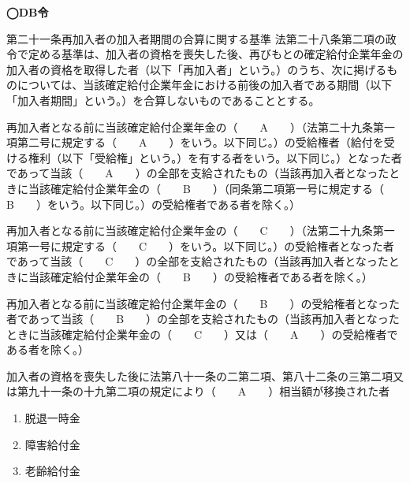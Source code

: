 \begin{fillblank}[自作 2026/10/11]
  \noindent \textbf{◯DB令}
  \begin{lawstructure}
    \begin{lawarticle}{第二十一条}{再加入者の加入者期間の合算に関する基準}
      法第二十八条第二項の政令で定める基準は、加入者の資格を喪失した後、再びもとの確定給付企業年金の加入者の資格を取得した者（以下「再加入者」という。）のうち、次に掲げるものについては、当該確定給付企業年金における前後の加入者である期間（以下「加入者期間」という。）を合算しないものであることとする。

      再加入者となる前に当該確定給付企業年金の（　　A　　）（法第二十九条第一項第二号に規定する（　　A　　）をいう。以下同じ。）の受給権者（給付を受ける権利（以下「受給権」という。）を有する者をいう。以下同じ。）となった者であって当該（　　A　　）の全部を支給されたもの（当該再加入者となったときに当該確定給付企業年金の（　　B　　）（同条第二項第一号に規定する（　　B　　）をいう。以下同じ。）の受給権者である者を除く。）

      再加入者となる前に当該確定給付企業年金の（　　C　　）（法第二十九条第一項第一号に規定する（　　C　　）をいう。以下同じ。）の受給権者となった者であって当該（　　C　　）の全部を支給されたもの（当該再加入者となったときに当該確定給付企業年金の（　　B　　）の受給権者である者を除く。）

      再加入者となる前に当該確定給付企業年金の（　　B　　）の受給権者となった者であって当該（　　B　　）の全部を支給されたもの（当該再加入者となったときに当該確定給付企業年金の（　　C　　）又は（　　A　　）の受給権者である者を除く。）

      加入者の資格を喪失した後に法第八十一条の二第二項、第八十二条の三第二項又は第九十一条の十九第二項の規定により（　　A　　）相当額が移換された者
    \end{lawarticle}
  \end{lawstructure}
\end{fillblank}

\begin{answerbox}
  \begin{enumerate}[A:]
    \item 脱退一時金
    \item 障害給付金
    \item 老齢給付金
  \end{enumerate}
\end{answerbox}

\newpage

